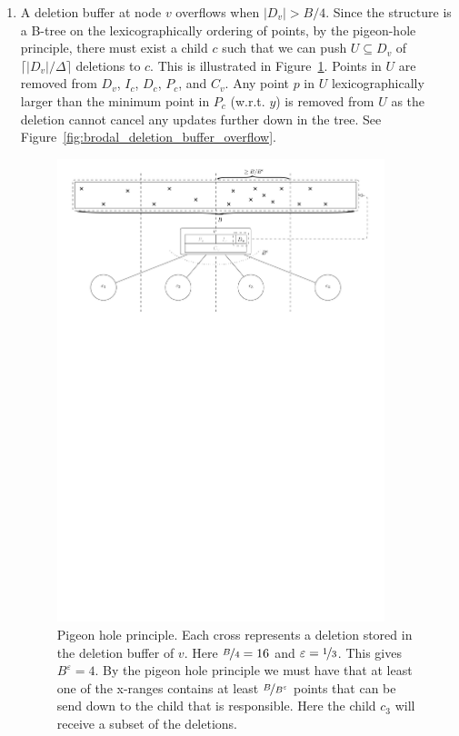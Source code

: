 \documentclass[twoside,11pt,openright]{report}
\def \epsilon {\varepsilon}
\begin{document}
\begin{enumerate}[label=(\roman*)]
	\item\label{update:del} A deletion buffer at node $v$ overflows when $\vert D_v \vert > B/4$. Since the structure is a B-tree on the lexicographically ordering of points, by the pigeon-hole principle, there must exist a child $c$ such that we can push $U \subseteq D_v$ of $\lceil \vert D_v \vert / \Delta \rceil$ deletions to $c$. This is illustrated in Figure~\ref{fig:pigeon_hole}. Points in $U$ are removed from $D_v$, $I_c$, $D_c$, $P_c$, and $C_v$. Any point $p$ in $U$ lexicographically larger than the minimum point in $P_c$ (w.r.t. $y$) is removed from $U$ as the deletion cannot cancel any updates further down in the tree. See Figure~\ref{fig:brodal_deletion_buffer_overflow}.
	
	\begin{figure}[htp!]
		\centering
		\includegraphics[width=0.9\textwidth]{../figures/pigeon_hole2}
		\caption{Pigeon hole principle. Each cross represents a deletion stored in the deletion buffer of $v$. Here $\nicefrac{B}{4} = 16$ and $\epsilon = \nicefrac{1}{3}$. This gives $B^{\epsilon} = 4$. By the pigeon hole principle we must have that at least one of the x-ranges contains at least $\nicefrac{B}{B^{\epsilon}}$ points that can be send down to the child that is responsible. Here the child $c_3$ will receive a subset of the deletions.}
		\label{fig:pigeon_hole}
	\end{figure}
	

\end{enumerate}
\end{document}
